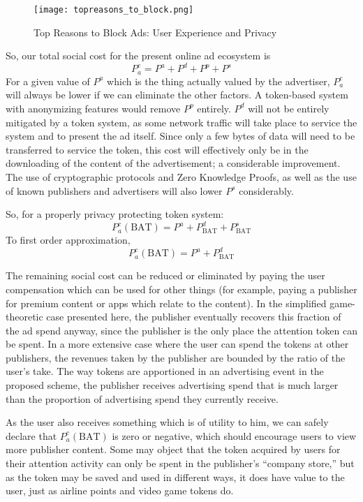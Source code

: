 \documentclass[11pt]{article}
\begin{document}
\begin{figure}
\begin{center}
\texttt{[image: topreasons\_to\_block.png]}
\caption{Top Reasons to Block Ads: User Experience and Privacy }
\end{center}
\end{figure}





So, our total social cost for the present online ad ecosystem is 
 \[P^{c}_a = P^{a} + P^{d} + P^{p} + P^{s}\]
 For a given value of $P^{a}$ which is the thing actually valued by the
 advertiser, $P^{c}_a $ will always be lower if we can eliminate the other
 factors. A token-based system with anonymizing features would remove $P^{p}$
 entirely. $P^{d}$ will not be entirely mitigated by a token system, as some
 network traffic will take place to service the system and to present
 the ad itself. Since only a few bytes of data will need to be
 transferred to service the token, this cost will effectively only be
 in the downloading of the content of the advertisement; a
 considerable improvement. The use of cryptographic protocols and Zero
 Knowledge Proofs, as well as the use of known publishers and
 advertisers will also lower $P^{s}$ considerably.

So, for a properly privacy protecting token system: 
  \[P^{c}_a(\textrm{BAT}) = P^{a} + P^{d}_{\textrm{BAT}} + P^{s}_{\textrm{BAT}}\]
  To first order approximation,  
  \[P^{c}_a(\textrm{BAT}) = P^{a} + P^{d}_{\textrm{BAT}} \]

The remaining social cost can be reduced or eliminated by paying the
user compensation which can be used for other things (for example,
paying a publisher for premium content or apps which relate to the
content). In the simplified game-theoretic case presented here, the
publisher eventually recovers this fraction of the ad spend anyway,
since the publisher is the only place the attention token can be
spent. In a more extensive case where the user can spend the tokens at
other publishers, the revenues taken by the publisher are bounded by
the ratio of the user's take. The way tokens are apportioned in an
advertising event in the proposed scheme, the publisher receives
advertising spend that is much larger than the proportion of
advertising spend they currently receive.

As the user also receives something which is of utility to him, we can
safely declare that $P^{c}_a(\textrm{BAT})$ is zero or negative, which should encourage users
to view more publisher content. Some may object that the token
acquired by users for their attention activity can only be spent in
the publisher's ``company store,'' but as the token may be saved and
used in different ways, it does have value to the user, just as
airline points and video game tokens do.
\end{document}
